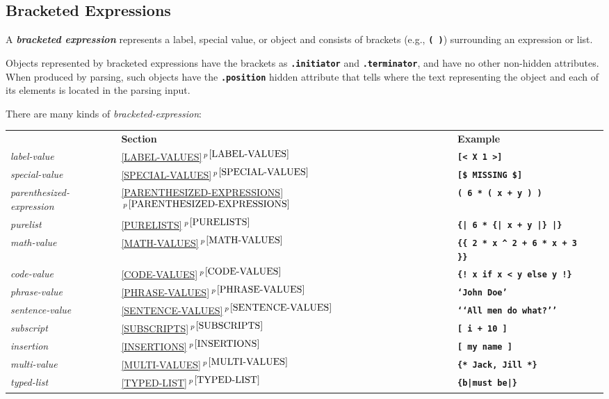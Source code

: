 \documentclass[12pt]{article}
\newcommand{\TT}[1]{{\tt \bfseries #1}}
\newcommand{\key}[1]{{\bf \em #1}\index{#1}}
\newcommand{\itemref}[1]{\ref{#1}$\,^{p\,\pageref{#1}}$}
\newcommand{\CIRCUM}{\textasciicircum}
\begin{document}
\subsection{Bracketed Expressions}
\label{BRACKETED-EXPRESSIONS}

A \key{bracketed expression} represents a label, special value, or object and
consists of brackets (e.g., \TT{(~)}) surrounding an expression or list.

Objects represented by bracketed expressions have the brackets as
\TT{.initiator} and \TT{.termin\-a\-tor}, and have no other non-hidden
attributes.  When produced by parsing, such objects have the
\TT{.posi\-tion} hidden attribute that tells where the text representing
the object and each of its elements is located in the parsing input.

There are many kinds of {\em bracketed-expression}:
\begin{center}
    \begin{tabular}[t]{l@{~~~~~}lll}
          & \bf Section & \bf Example \\[1ex]
      {\em label-value}
    & \itemref{LABEL-VALUES}
    & \TT{[< X 1 >]}
    \\
      {\em special-value}
    & \itemref{SPECIAL-VALUES}
    & \TT{[\$ MISSING \$]}
    \\
      {\em parenthesized-expression}
    & \itemref{PARENTHESIZED-EXPRESSIONS}
    & \TT{( 6 * ( x + y ) )}
    \\
      {\em purelist}
    & \itemref{PURELISTS}
    & \TT{\{| 6 * \{| x + y |\} |\}}
    \\
      {\em math-value}
    & \itemref{MATH-VALUES}
    & \TT{\{\{ 2 * x \CIRCUM{} 2 + 6 * x + 3 \}\}} 
    \\
      {\em code-value}
    & \itemref{CODE-VALUES}
    & \TT{\{! x if x < y else y !\}} 
    \\
      {\em phrase-value}
    & \itemref{PHRASE-VALUES}
    & \TT{`John Doe'}
    \\
      {\em sentence-value}
    & \itemref{SENTENCE-VALUES}
    & \TT{`{}`All men do what?'{}'}
    \\
      {\em subscript}
    & \itemref{SUBSCRIPTS}
    & \TT{[ i + 10 ]}
    \\
      {\em insertion}
    & \itemref{INSERTIONS}
    & \TT{[ my name ]}
    \\
      {\em multi-value}
    & \itemref{MULTI-VALUES}
    & \TT{\{* Jack, Jill *\}}
    \\
      {\em typed-list}
    & \itemref{TYPED-LIST}
    & \TT{\{b|must be|\}}
    \\
    \end{tabular}
\end{center}
\end{document}
